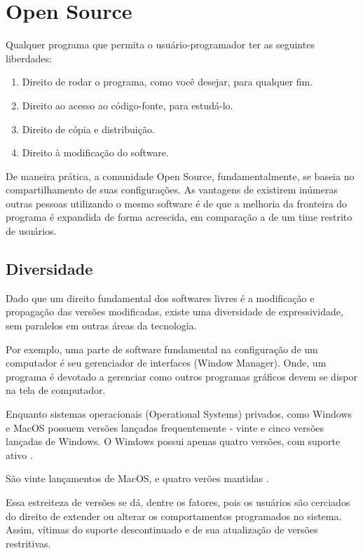 \documentclass[
12pt,				%
openright,			%
oneside,			%
a4paper,			%
english,			%
french,				%
spanish,			%
brazil,				%
]{abntex2}
\begin{document}
\section{Open Source}
\label{sec:opensource}
Qualquer programa que permita o usuário-programador ter as seguintes liberdades:

\begin{enumerate}
\item Direito de rodar o programa, como você desejar, para qualquer fim.
\item Direito ao acesso ao código-fonte, para estudá-lo.
\item Direito de cópia e distribuição.
\item Direito à modificação do software.
\end{enumerate}

De maneira prática, a comunidade Open Source, fundamentalmente, se baseia no compartilhamento de suas configurações. As vantagens de existirem inúmeras outras pessoas utilizando o mesmo software é de que a melhoria da fronteira do programa é expandida de forma acrescida, em comparação a de um time restrito de usuários.

\subsection{Diversidade}
\label{sec:diversidade}

Dado que um direito fundamental dos softwares livres é a modificação e propagação das versões modificadas, existe uma diversidade de expressividade, sem paralelos em outras áreas da tecnologia.

Por exemplo, uma parte de software fundamental na configuração de um computador é seu gerenciador de interfaces (Window Manager). Onde, um programa é devotado a gerenciar como outros programas gráficos devem se dispor na tela de computador.

Enquanto sistemas operacionais (Operational Systems) privados, como Windows e MacOS possuem versões lançadas frequentemente - vinte e cinco versões lançadas de Windows. O Windows possui apenas quatro versões, com suporte ativo \cite{wikipedia_2021W}.

São vinte lançamentos de MacOS, e quatro verões mantidas \cite{wikipedia_2021Mac}.

Essa estreiteza de versões se dá, dentre os fatores, pois os usuários são cerciados do direito de extender ou alterar os comportamentos programados no sistema. Assim, vítimas do suporte descontinuado e de sua atualização de versões restritivas.
\end{document}
